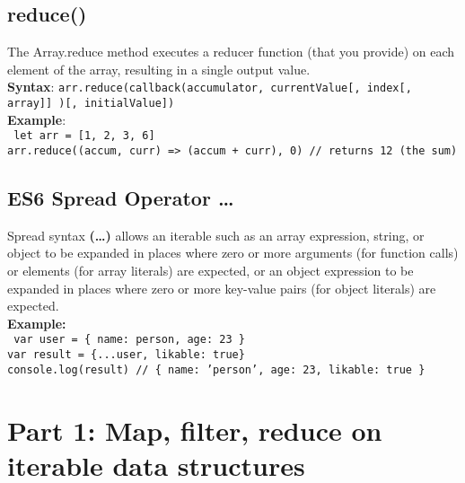 \documentclass[12pt]{article}
\begin{document}
\subsection{reduce()}
The Array.reduce method executes a reducer function (that you provide) on each element of the array, resulting in a single output value.\footnotemark[\ref{note1}] \\
\textbf{Syntax}: \texttt{arr.reduce(callback(accumulator, currentValue[, index[, array]] )[, initialValue])} \\
\textbf{Example}:\\
\texttt{ let arr = [1, 2, 3, 6] \\
arr.reduce((accum, curr) => (accum + curr), 0) // returns 12 (the sum)
}

\subsection{ES6 Spread Operator \ldots}
Spread syntax \textbf{(\ldots)} allows an iterable such as an array expression, string, or object to be expanded in places where zero or more arguments (for function calls) or elements (for array literals) are expected, or an object expression to be expanded in places where zero or more key-value pairs (for object literals) are expected.\footnotemark[\ref{note1}] \\ \noindent
\textbf{Example:} \\
\texttt{
var user = \{ name: \textquotesingle person\textquotesingle, age: 23 \} \\
var result = \{...user, likable: true\} \\
console.log(result) // \{ name: 'person', age: 23, likable: true \}
}


\newpage
\section{Part 1: Map, filter, reduce on iterable data structures}
\end{document}
